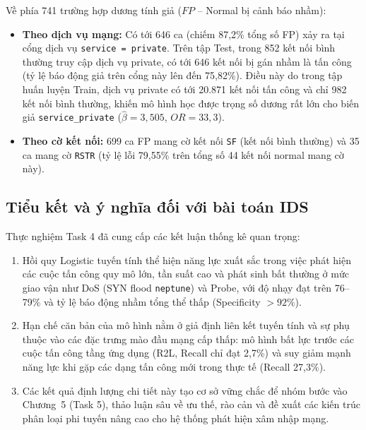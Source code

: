 Về phía 741 trường hợp dương tính giả ($FP$ -- Normal bị cảnh báo nhầm):
\begin{itemize}[leftmargin=1.2cm,itemsep=2pt]
\item \textbf{Theo dịch vụ mạng:} Có tới 646 ca (chiếm 87,2\% tổng số FP) xảy ra tại cổng dịch vụ \texttt{service = private}. Trên tập Test, trong 852 kết nối bình thường truy cập dịch vụ private, có tới 646 kết nối bị gán nhầm là tấn công (tỷ lệ báo động giả trên cổng này lên đến 75,82\%). Điều này do trong tập huấn luyện Train, dịch vụ private có tới 20.871 kết nối tấn công và chỉ 982 kết nối bình thường, khiến mô hình học được trọng số dương rất lớn cho biến giả \texttt{service\_private} ($\hat\beta = 3{,}505$, $OR = 33{,}3$).
\item \textbf{Theo cờ kết nối:} 699 ca FP mang cờ kết nối \texttt{SF} (kết nối bình thường) và 35 ca mang cờ \texttt{RSTR} (tỷ lệ lỗi 79,55\% trên tổng số 44 kết nối normal mang cờ này).
\end{itemize}

\subsection{Tiểu kết và ý nghĩa đối với bài toán IDS}
Thực nghiệm Task 4 đã cung cấp các kết luận thống kê quan trọng:
\begin{enumerate}[leftmargin=1.2cm,itemsep=3pt]
\item Hồi quy Logistic tuyến tính thể hiện năng lực xuất sắc trong việc phát hiện các cuộc tấn công quy mô lớn, tần suất cao và phát sinh bất thường ở mức giao vận như DoS (SYN flood \texttt{neptune}) và Probe, với độ nhạy đạt trên 76--79\% và tỷ lệ báo động nhầm tổng thể thấp (Specificity $>92\%$).
\item Hạn chế căn bản của mô hình nằm ở giả định liên kết tuyến tính và sự phụ thuộc vào các đặc trưng mào đầu mạng cấp thấp: mô hình bất lực trước các cuộc tấn công tầng ứng dụng (R2L, Recall chỉ đạt 2,7\%) và suy giảm mạnh năng lực khi gặp các dạng tấn công mới trong thực tế (Recall 27,3\%).
\item Các kết quả định lượng chi tiết này tạo cơ sở vững chắc để nhóm bước vào Chương~5 (Task 5), thảo luận sâu về ưu thế, rào cản và đề xuất các kiến trúc phân loại phi tuyến nâng cao cho hệ thống phát hiện xâm nhập mạng.
\end{enumerate}
\FloatBarrier
